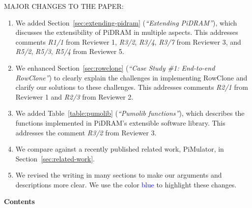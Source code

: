 MAJOR CHANGES TO THE PAPER:
\begin{enumerate}
	\item We added Section~\ref{sec:extending-pidram} (\emph{``Extending PiDRAM''}), which discusses the extensibility of PiDRAM in multiple aspects. This addresses comments \emph{R1/1} from Reviewer 1, \emph{R3/2}, \emph{R3/4}, \emph{R3/7} from Reviewer 3, and \emph{R5/2}, \emph{R5/3}, \emph{R5/4} from Reviewer 5.

	\item We enhanced Section~\ref{sec:rowclone} (\emph{``Case Study \#1: End-to-end RowClone''}) to clearly explain the challenges in implementing RowClone  and clarify our solutions to these challenges. This addresses comments \emph{R2/1} from Reviewer 1 and \emph{R2/3} from Reviewer 2.

	\item We added Table~\ref{table:pumolib} (\emph{``Pumolib functions''}), which describes the functions implemented in PiDRAM's extensible software library. This addresses the comment \emph{R3/2} from Reviewer 3.
	
	\item We compare against a recently published related work, PiMulator, in Section~\ref{sec:related-work}. 

	\item We revised the writing in many sections to make our arguments and descriptions more clear. We use the color \textcolor{blue}{blue} to highlight these changes.
\end{enumerate}




\def\mydots{\leavevmode\xleaders\hbox to 0.45em{\hfil.\hfil}\hfill\kern0pt}

\vspace{25pt}



\noindent \textbf{\large{Contents}} 
\vspace{5pt}

